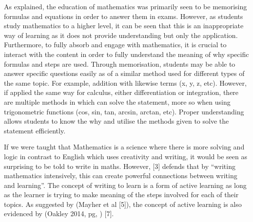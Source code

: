 \documentclass[12pt, a4paper,oneside]{book}
\numberwithin{equation}{section}
\begin{document}
As explained, the education of mathematics was primarily seen to be memorising formulas and equations in order to answer them in exams. However, as students study mathematics to a higher level, it can be seen that this is an inappropriate way of learning as it does not provide understanding but only the application. Furthermore, to fully absorb and engage with mathematics, it is crucial to interact with the content in order to fully understand the meaning of why specific formulas and steps are used. Through memorisation, students may be able to answer specific questions easily as of a similar method used for different types of the same topic. For example, addition with likewise terms (x, y, z, etc). However, if applied the same way for calculus, either differentiation or integration, there are multiple methods in which can solve the statement, more so when using trigonometric functions (cos, sin, tan, arcsin, arctan, etc). Proper understanding allows students to know the why and utilise the methods given to solve the statement efficiently.

If we were taught that Mathematics is a science where there is more solving and logic in contrast to English which uses creativity and writing, it would be seen as surprising to be told to write in maths. However, [3] defends that by “writing mathematics intensively, this can create powerful connections between writing and learning”. The concept of writing to learn is a form of active learning as long as the learner is trying to make meaning of the steps involved for each of their topics. As suggested by (Mayher et al [5]), the concept of active learning is also evidenced by (Oakley 2014, pg, ) [7].
\end{document}
